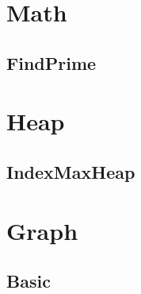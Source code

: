 \section{Math}
    \subsection{FindPrime}
        

\section{Heap}
    \subsection{IndexMaxHeap}
        

\section{Graph}
    \subsection{Basic}
        
        